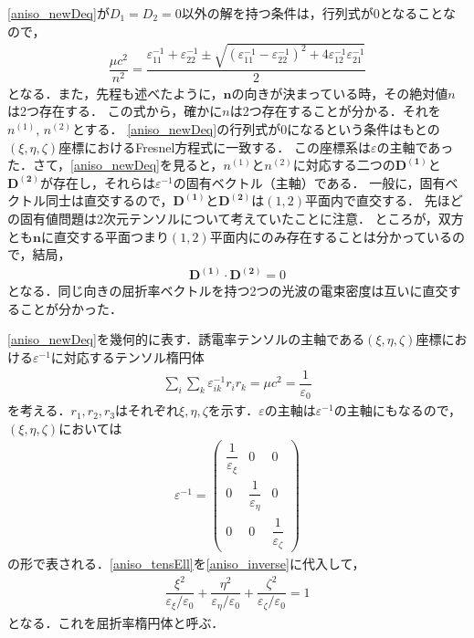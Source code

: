 \eqref{aniso_newDeq}が$D_1=D_2=0$以外の解を持つ条件は，行列式が0となることなので，
\begin{align}
  \dfrac{\mu{}c^2}{n^2}=\dfrac{\varepsilon^{-1}_{11}+\varepsilon^{-1}_{22}\pm\sqrt{(\varepsilon^{-1}_{11}-\varepsilon^{-1}_{22})^2+4\varepsilon^{-1}_{12}\varepsilon^{-1}_{21}}}{2}
\end{align}
となる．また，先程も述べたように，$\boldsymbol{n}$の向きが決まっている時，その絶対値$n$は2つ存在する．
この式から，確かに$n$は2つ存在することが分かる．それを$n^{(1)}$, $n^{(2)}$とする．
\eqref{aniso_newDeq}の行列式が0になるという条件はもとの$(\xi,\eta,\zeta)$座標におけるFresnel方程式に一致する．
この座標系は$\varepsilon$の主軸であった．さて，\eqref{aniso_newDeq}を見ると，$n^{(1)}$と$n^{(2)}$に対応する二つの$\boldsymbol{D^{(1)}}$と$\boldsymbol{D^{(2)}}$が存在し，それらは$\varepsilon^{-1}$の固有ベクトル（主軸）である．
一般に，固有ベクトル同士は直交するので，$\boldsymbol{D^{(1)}}$と$\boldsymbol{D^{(2)}}$は$(1,2)$平面内で直交する．
先ほどの固有値問題は2次元テンソルについて考えていたことに注意．
ところが，双方とも$\boldsymbol{n}$に直交する平面つまり$(1,2)$平面内にのみ存在することは分かっているので，結局，
\begin{align}
  \boldsymbol{D^{(1)}}\cdot\boldsymbol{D^{(2)}}=0
\end{align}
となる．同じ向きの屈折率ベクトルを持つ2つの光波の電束密度は互いに直交することが分かった．

\eqref{aniso_newDeq}を幾何的に表す．誘電率テンソルの主軸である$(\xi,\eta,\zeta)$座標における$\varepsilon^{-1}$に対応するテンソル楕円体
\begin{align}
  \sum_i\sum_k\varepsilon^{-1}_{ik}r_ir_k=\mu{c^2}=\dfrac{1}{\varepsilon_0}\label{aniso_tensEll}
\end{align}
を考える．$r_1,r_2,r_3$はそれぞれ$\xi,\eta,\zeta$を示す．$\varepsilon$の主軸は$\varepsilon^{-1}$の主軸にもなるので，$(\xi,\eta,\zeta)$においては
\begin{align}
  \varepsilon^{-1}
  =
  \begin{pmatrix}
    \dfrac{1}{\varepsilon_\xi} & 0 & 0 \\
    0 & \dfrac{1}{\varepsilon_\eta} & 0 \\
    0 & 0 & \dfrac{1}{\varepsilon_\zeta}
  \end{pmatrix}\label{aniso_inverse}
\end{align}
の形で表される．\eqref{aniso_tensEll}を\eqref{aniso_inverse}に代入して，
\begin{align}
  \dfrac{\xi^2}{\varepsilon_\xi/\varepsilon_0}+\dfrac{\eta^2}{\varepsilon_\eta/\varepsilon_0}+\dfrac{\zeta^2}{\varepsilon_\zeta/\varepsilon_0}=1\label{aniso_nEll}
\end{align}
となる．これを屈折率楕円体と呼ぶ．

